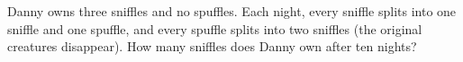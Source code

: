 Danny owns three sniffles and no spuffles. Each night, every sniffle splits into one sniffle and one spuffle, and every spuffle splits into two sniffles (the original creatures disappear). How many sniffles does Danny own after ten nights?
